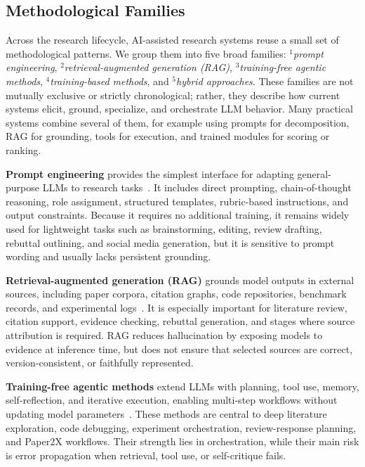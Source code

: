 \documentclass{llmxive}
\begin{document}
\subsection{Methodological Families}
\label{sec:methods_overview}

Across the research lifecycle, AI-assisted research systems reuse a small set of methodological patterns. We group them into five broad families: $^1$\emph{prompt engineering}, $^2$\emph{retrieval-augmented generation (RAG)}, $^3$\emph{training-free agentic methods}, $^4$\emph{training-based methods}, and $^5$\emph{hybrid approaches}. These families are not mutually exclusive or strictly chronological; rather, they describe how current systems elicit, ground, specialize, and orchestrate LLM behavior. Many practical systems combine several of them, for example using prompts for decomposition, RAG for grounding, tools for execution, and trained modules for scoring or ranking.

\textbf{Prompt engineering} provides the simplest interface for adapting general-purpose LLMs to research tasks~\cite{wei2022chain,yao2023react}. It includes direct prompting, chain-of-thought reasoning, role assignment, structured templates, rubric-based instructions, and output constraints. Because it requires no additional training, it remains widely used for lightweight tasks such as brainstorming, editing, review drafting, rebuttal outlining, and social media generation, but it is sensitive to prompt wording and usually lacks persistent grounding.

\textbf{Retrieval-augmented generation (RAG)} grounds model outputs in external sources, including paper corpora, citation graphs, code repositories, benchmark records, and experimental logs~\cite{lewis2020retrieval}. It is especially important for literature review, citation support, evidence checking, rebuttal generation, and stages where source attribution is required. RAG reduces hallucination by exposing models to evidence at inference time, but does not ensure that selected sources are correct, version-consistent, or faithfully represented.

\textbf{Training-free agentic methods} extend LLMs with planning, tool use, memory, self-reflection, and iterative execution, enabling multi-step workflows without updating model parameters~\cite{yao2023react,schick2023toolformer,shinn2023reflexion}. These methods are central to deep literature exploration, code debugging, experiment orchestration, review-response planning, and Paper2X workflows. Their strength lies in orchestration, while their main risk is error propagation when retrieval, tool use, or self-critique fails.
\end{document}
